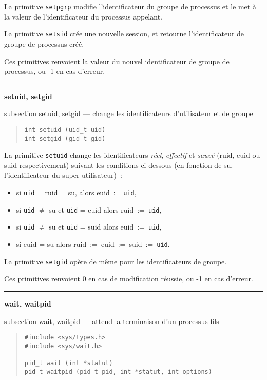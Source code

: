 \documentclass [twoside] {report}
\newcommand {\primitive} [1]
    {
	{\large \bf #1}
	\addcontentsline {toc} {subsection} {#1}
    }
\newcommand {\separation}
    {
	\vspace {7mm}
	\nopagebreak
	\hrule
    }
\begin{document}
La primitive {\tt setpgrp} modifie l'identificateur du groupe
de processus et le met à la valeur de l'identificateur du
processus appelant.

La primitive {\tt setsid} crée une nouvelle session, et retourne
l'identificateur de groupe de processus créé.

Ces primitives renvoient la valeur du nouvel identificateur
de groupe de processus, ou -1 en cas d'erreur.




\separation
\primitive {setuid, setgid} --- change les identificateurs d'utilisateur et de groupe

\begin {quote}
\begin {verbatim}
int setuid (uid_t uid)
int setgid (gid_t gid)
\end{verbatim}
\end {quote}

La primitive {\tt setuid} change les identificateurs
{\it réel}, {\it effectif} et {\it sauvé} (ruid, euid ou
suid respectivement) suivant les conditions
ci-dessous (en fonction de su, l'identificateur du
super utilisateur)~:

\begin {itemize}
\item si {\tt uid} = ruid = su, alors euid~:= {\tt uid},
\item si {\tt uid} {$\neq$} su et {\tt uid} = euid alors ruid~:=~{\tt uid},
\item si {\tt uid} {$\neq$} su et {\tt uid} = suid alors euid~:=~{\tt uid},
\item si euid = su alors ruid~:=~euid~:=~suid~:=~{\tt uid}.
\end {itemize}

La primitive {\tt setgid} opère de même pour les
identificateurs de groupe.

Ces primitives renvoient 0 en cas de modification
réussie, ou -1 en cas d'erreur.




\separation
\primitive {wait, waitpid} --- attend la terminaison d'un processus fils

\begin {quote}
\begin {verbatim}
#include <sys/types.h>
#include <sys/wait.h>

pid_t wait (int *statut)
pid_t waitpid (pid_t pid, int *statut, int options)
\end{verbatim}
\end {quote}
\end{document}
